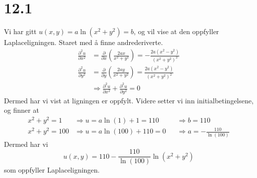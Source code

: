 \documentclass[11pt, a4paper, norsk]{NTNUoving}
\begin{document}
\section*{12.1}
\begin{oppgave}[15]
  Vi har gitt $u(x,y)=a\ln(x^2+y^2)=b$, og vil vise at den oppfyller Laplaceligningen. Staret med å finne andrederiverte.
  \begin{align*}
    \frac{\partial^2u}{\partial x^2} &= \frac{\partial}{\partial x}\left(\frac{2ax}{x^2+y^2}\right) = -\frac{2a(x^2-y^2)}{(x^2+y^2)^2}\\
    \frac{\partial^2u}{\partial y^2} &= \frac{\partial}{\partial y}\left(\frac{2ay}{x^2+y^2}\right) = \frac{2a(x^2-y^2)}{(x^2+y^2)^2}\\
    &\Rightarrow \frac{\partial^2u}{\partial x^2} + \frac{\partial^2u}{\partial y^2} = 0
  \end{align*}
  Dermed har vi vist at ligningen er oppfylt. Videre setter vi inn initialbetingelsene, og finner at
  \begin{align*}
    x^2+y^2 = 1 &\Rightarrow u=a\ln(1)+1 = 110 &&\Rightarrow b=110 \\
    x^2+y^2 = 100 &\Rightarrow u=a\ln(100)+110 = 0 &&\Rightarrow a=-\frac{110}{\ln(100)}
  \end{align*}
  Dermed har vi
  \[
    u(x,y) = 110 - \frac{110}{\ln(100)} \ln(x^2+y^2)
  \]
  som oppfyller Laplaceligningen.
\end{oppgave}
\end{document}
